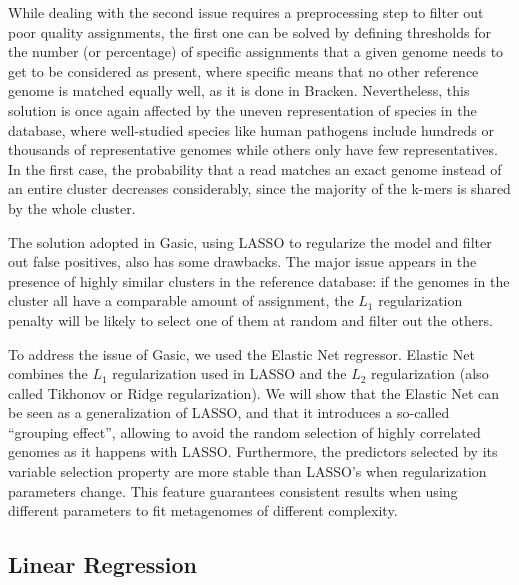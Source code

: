 While dealing with the second issue requires a preprocessing step to filter out poor quality assignments, the first one can be solved by defining thresholds for the number (or percentage) of specific assignments that a given genome needs to get to be considered as present, where specific means that no other reference genome is matched equally well, as it is done in Bracken. Nevertheless, this solution is once again affected by the uneven representation of species in the database, where well-studied species like human pathogens include hundreds or thousands of representative genomes while others only have few representatives. In the first case, the probability that a read matches an exact genome instead of an entire cluster decreases considerably, since the majority of the k-mers is shared by the whole cluster.

The solution adopted in Gasic, using LASSO to regularize the model and filter out false positives, also has some drawbacks. The major issue appears in the presence of highly similar clusters in the reference database: if the genomes in the cluster all have a comparable amount of assignment, the $L_1$ regularization penalty will be likely to select one of them at random and filter out the others.

To address the issue of Gasic, we used the Elastic Net regressor. Elastic Net combines the $L_1$ regularization used in LASSO and the $L_2$ regularization (also called Tikhonov or Ridge regularization). We will show that the Elastic Net can be seen as a generalization of LASSO, and that it introduces a so-called ``grouping effect'', allowing to avoid the random selection of highly correlated genomes as it happens with LASSO. Furthermore, the predictors selected by its variable selection property are more stable than LASSO's when regularization parameters change. This feature guarantees consistent results when using different parameters to fit metagenomes of different complexity.

\subsection{Linear Regression}

